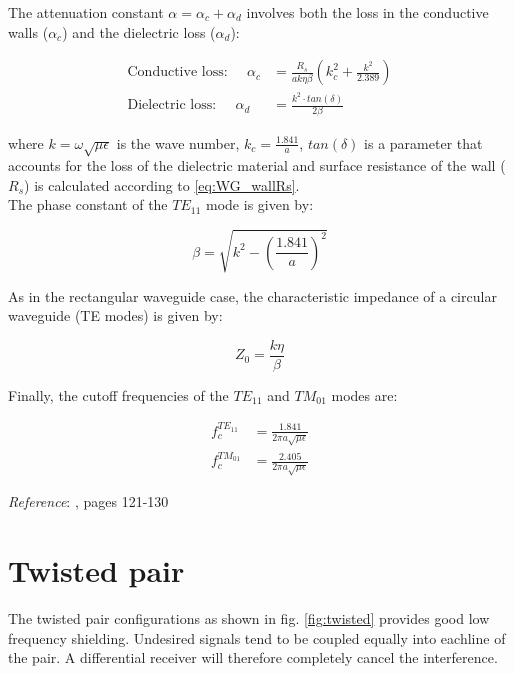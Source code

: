 \noindent The attenuation constant $\alpha = \alpha_c + \alpha_d$ involves both the loss in the conductive walls ($\alpha_c$) and the dielectric loss ($\alpha_d$):

\begin{align}
    \text{Conductive loss:} \;\;\;\;\; \alpha_c & = \frac{R_s}{a k \eta \beta} \left( k_c^2 + \frac{k^2}{2.389}\right) \\
    \text{Dielectric loss:} \;\;\;\;\;\alpha_d & = \frac{k^2 \cdot tan (\delta)}{ 2\beta}
\end{align}

\noindent where $k = \omega \sqrt{\mu \epsilon}$ is the wave number, $k_c = \frac{1.841}{a}$, $tan (\delta)$ is a parameter that accounts for the loss of the dielectric material and surface resistance of the wall ($R_s$) is calculated according to \ref{eq:WG_wallRs}.\\


\noindent The phase constant of the $TE_{11}$ mode is given by:

\begin{equation}
\beta = \sqrt{k^2 - \left( \frac{1.841}{a}\right)^2}
\end{equation}

\noindent As in the rectangular waveguide case, the characteristic impedance of a circular waveguide (TE modes) is given by:

\begin{equation}
Z_0 = \frac{k \eta}{\beta}
\end{equation}

\noindent Finally, the cutoff frequencies of the $TE_{11}$ and $TM_{01}$ modes are:

\begin{align}
f_c^{TE_{11}} & = \frac{1.841}{2 \pi a \sqrt{\mu \epsilon}} \\
f_c^{TM_{01}} & = \frac{2.405}{2 \pi a \sqrt{\mu \epsilon}}
\end{align}

\noindent \textit{Reference}: \cite{Pozar}, pages 121-130


\section{Twisted pair}

The twisted pair configurations as shown in fig. \ref{fig:twisted}
provides good low frequency shielding.  Undesired signals tend to be
coupled equally into eachline of the pair.  A differential receiver
will therefore completely cancel the interference.


